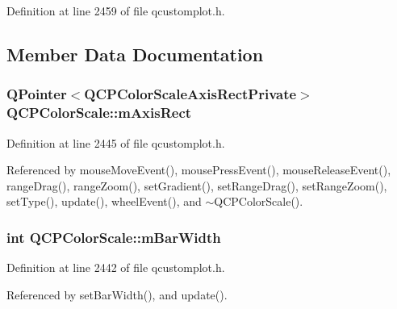 Definition at line 2459 of file qcustomplot.\+h.



\subsection{Member Data Documentation}
\hypertarget{class_q_c_p_color_scale_a6e37f7d49cd614dc50ef1caae60461b9}{}
\subsubsection[{m\+Axis\+Rect}]{\setlength{\rightskip}{0pt plus 5cm}Q\+Pointer$<${\bf Q\+C\+P\+Color\+Scale\+Axis\+Rect\+Private}$>$ Q\+C\+P\+Color\+Scale\+::m\+Axis\+Rect\hspace{0.3cm}{\ttfamily [protected]}}\label{class_q_c_p_color_scale_a6e37f7d49cd614dc50ef1caae60461b9}


Definition at line 2445 of file qcustomplot.\+h.



Referenced by mouse\+Move\+Event(), mouse\+Press\+Event(), mouse\+Release\+Event(), range\+Drag(), range\+Zoom(), set\+Gradient(), set\+Range\+Drag(), set\+Range\+Zoom(), set\+Type(), update(), wheel\+Event(), and $\sim$\+Q\+C\+P\+Color\+Scale().

\hypertarget{class_q_c_p_color_scale_a409d2ab78dff1f92da5e6acfb062e811}{}
\subsubsection[{m\+Bar\+Width}]{\setlength{\rightskip}{0pt plus 5cm}int Q\+C\+P\+Color\+Scale\+::m\+Bar\+Width\hspace{0.3cm}{\ttfamily [protected]}}\label{class_q_c_p_color_scale_a409d2ab78dff1f92da5e6acfb062e811}


Definition at line 2442 of file qcustomplot.\+h.



Referenced by set\+Bar\+Width(), and update().

\hypertarget{class_q_c_p_color_scale_a2efbc90fd31898fe05d2b74a8422b1d5}{}
